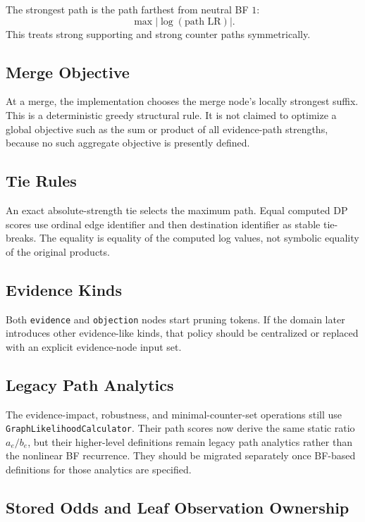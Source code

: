 \documentclass[11pt]{article}
\begin{document}
The strongest path is the path farthest from neutral BF \(1\):
\[
    \max |\log(\text{path LR})|.
\]
This treats strong supporting and strong counter paths symmetrically.

\subsection{Merge Objective}

At a merge, the implementation chooses the merge node's locally strongest
suffix.  This is a deterministic greedy structural rule.  It is not claimed
to optimize a global objective such as the sum or product of all evidence-path
strengths, because no such aggregate objective is presently defined.

\subsection{Tie Rules}

An exact absolute-strength tie selects the maximum path.  Equal computed DP
scores use ordinal edge identifier and then destination identifier as stable
tie-breaks.  The equality is equality of the computed log values, not symbolic
equality of the original products.

\subsection{Evidence Kinds}

Both \texttt{evidence} and \texttt{objection} nodes start pruning tokens.  If
the domain later introduces other evidence-like kinds, that policy should be
centralized or replaced with an explicit evidence-node input set.

\subsection{Legacy Path Analytics}

The evidence-impact, robustness, and minimal-counter-set operations still use
\texttt{GraphLikelihoodCalculator}.  Their path scores now derive the same
static ratio \(a_e/b_e\), but their higher-level definitions remain legacy
path analytics rather than the nonlinear BF recurrence.  They should be
migrated separately once BF-based definitions for those analytics are
specified.

\subsection{Stored Odds and Leaf Observation Ownership}
\end{document}
